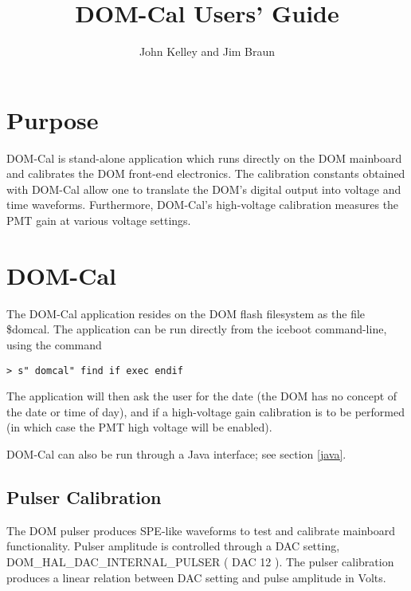 \documentclass[10pt]{article}
\begin{document}
                                                                                
\baselineskip=16pt
\def\Z{{\bf Z}}

\newcommand{\infinity}{\infty}

\title{DOM-Cal Users' Guide}
\author{John Kelley and Jim Braun}
\maketitle

\newpage

\section{Purpose}

DOM-Cal is stand-alone application which runs directly on the DOM mainboard
and calibrates the DOM front-end electronics.  The calibration constants
obtained with DOM-Cal allow one to translate the DOM's digital output
into voltage and time waveforms.  Furthermore, DOM-Cal's high-voltage
calibration measures the PMT gain at various voltage settings.  

\section{DOM-Cal}

The DOM-Cal application resides on the DOM flash filesystem as the file
\$domcal.  The application can be run directly from the iceboot
command-line, using the command 

\begin{verbatim}
> s" domcal" find if exec endif
\end{verbatim}

The application will then ask the user for the date (the DOM has no concept
of the date or time of day), and if a high-voltage gain calibration is to
be performed (in which case the PMT high voltage will be enabled).  

DOM-Cal can also be run through a Java interface; see section \ref{java}.

\subsection{Pulser Calibration}

The DOM pulser produces SPE-like waveforms to test and calibrate mainboard
functionality.  Pulser amplitude is controlled through a DAC setting,
DOM\_HAL\_DAC\_INTERNAL\_PULSER ( DAC 12 ).  The pulser calibration
produces a linear relation between DAC setting and pulse amplitude in Volts.
\end{document}
